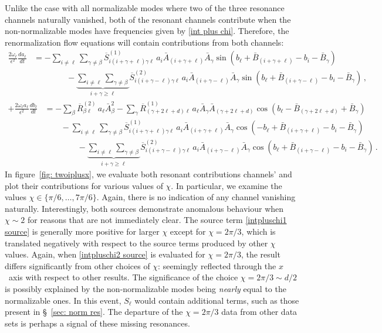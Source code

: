 \documentclass[letterpaper,11pt]{article}
\newcommand{\ol}{\omega_\ell}
\begin{document}
Unlike the case with all normalizable modes where two of the three resonance channels naturally vanished, both of the resonant channels contribute when the non-normalizable modes have frequencies given by \eqref{int plus chi}. Therefore, the renormalization flow equations will contain contributions from both channels:
\begin{align}
\frac{2 \ol}{\epsilon^2} \frac{d a_\ell}{d t} &= - \sum_{i \neq \ell} \sum_{\gamma \neq \beta} \overline{S}^{(1)}_{i (i + \gamma + \ell) \gamma \ell} \, a_i \bar A_{(i + \gamma + \ell)} \bar A_\gamma \sin \left( b_\ell + \bar B_{(i + \gamma + \ell)} - b_i - \bar B_\gamma \right) \nonumber \\
%
& \qquad \qquad -  \underbrace{\sum_{i \neq \ell} \sum_{\gamma \neq \beta}}_{i + \gamma \geq \ell} \overline{S}^{(2)}_{i (i + \gamma - \ell) \gamma \ell} \, a_i \bar A_{(i + \gamma - \ell)} \bar A_\gamma \sin \left( b_\ell + \bar B_{(i+\gamma - \ell)} - b_i - \bar B_\gamma \right) \, ,
\end{align}
\begin{align}
	+\frac{2 \ol a_\ell}{\epsilon^2} \frac{d b_\ell}{dt} &=  - \sum_\beta \overline{R}^{(2)}_{\beta\ell} \, a_\ell \bar A_\beta^2 - \sum_\gamma \overline{R}^{(1)}_{(\gamma + 2\ell + d) \ell} \, a_\ell \bar A_\gamma \bar A_{(\gamma + 2\ell + d)} \cos \left(b_\ell - \bar B_{(\gamma + 2\ell + d)} + \bar B_\gamma  \right) \nonumber \\
%
& \qquad - \sum_{i \neq \ell} \sum_{\gamma \neq \beta} \overline{S}^{(1)}_{i (i + \gamma + \ell) \gamma \ell} \, a_i \bar A_{(i + \gamma + \ell)} \bar A_\gamma \cos \left( - b_\ell + \bar B_{(i + \gamma + \ell)} - b_i - \bar B_\gamma \right) \nonumber \\
%
& \qquad \qquad -  \underbrace{\sum_{i \neq \ell} \sum_{\gamma \neq \beta}}_{i + \gamma \geq \ell} \overline{S}^{(2)}_{i (i + \gamma - \ell) \gamma \ell} \, a_i \bar A_{(i + \gamma - \ell)} \bar A_\gamma \cos \left( b_\ell + \bar B_{(i+\gamma - \ell)} - b_i - \bar B_\gamma \right) \, .
\end{align}
In figure~\ref{fig: twoiplusx}, we evaluate both resonant contributions channels' and plot their contributions for various values of $\chi$. In particular, we examine the values $\chi \in \{ \pi/6, \ldots, 7\pi/6 \}$. Again, there is no indication of any channel vanishing naturally. Interestingly, both sources demonstrate anomalous behaviour when $\chi \sim 2$ for reasons that are not immediately clear. The source term \eqref{intpluschi1 source} is generally more positive for larger $\chi$ except for $\chi = 2 \pi / 3$, which is translated negatively with respect to the source terms produced by other $\chi$ values. Again, when \eqref{intpluschi2 source} is evaluated for $\chi = 2 \pi/3$, the result differs significantly from other choices of $\chi$: seemingly reflected through the $x$~axis with respect to other results. The significance of the choice $\chi = 2\pi / 3 \sim d / 2$ is possibly explained by the non-normalizable modes being \emph{nearly} equal to the normalizable ones. In this event, $S_\ell$ would contain additional terms, such as those present in \S~\!\ref{sec: norm res}. The departure of the $\chi = 2\pi/3$ data from other data sets is perhaps a signal of these missing resonances.
\end{document}
